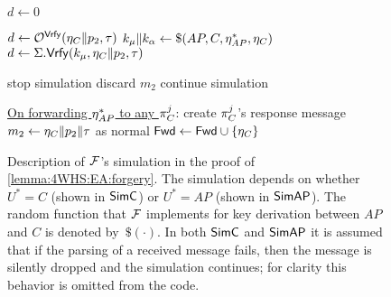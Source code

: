 \begin{figure}
\begin{adjustbox}{margin*=2ex,width=0.997\textwidth,frame,center}
\begin{minipage}[t]{0.5\textwidth}
\begin{algorithmic}[1]
					\EndIf
					
					\State
					\State $d \gets 0$ \label{code:simAP:line:d_bit_init}
										
					 \label{code:simAP:line:embed_MAC_oracle:check}
						\State $d \gets \mathcal{O}^{\macvrfy}(\nonce_{C} \concat p_2, \tau)$ \label{code:simAP:line:embed_MAC_oracle}
					\Else
						\State $\key_{\mu} \concat \key_\alpha \gets \$(AP, C, \nonce_{AP}^*, \nonce_{C})$ \label{code:simAP:line:derive_PTK}
						\State $d \gets \mac.\macvrfy(\key_{\mu}, \nonce_{C} \concat p_2, \tau)$ \label{code:simAP:line:local_MAC_check}
					\EndIf
					
					\State
					 \label{code:simAP:line:IFd=1}
						\State stop simulation \label{code:simAP:line:stop_simulation}
					\Else
						\State discard $m_2$
						\State continue simulation \label{code:simAP:line:m_2_end}
					\EndIf
					
				\EndIndent
				
				\Statex
				
				\Statex \underline{On forwarding $\nonce_{AP}^*$ to any $\oracle[C][j]$}: \label{code:simAP:line:forward_AP_nonce_start}
				\setcounter{ALG@line}{400} 
				\Indent
					\State create $\oracle[C][j]$'s response message 
					\State $m_2 \gets \nonce_C \concat p_2 \concat \tau$ as normal  
					\State $\mathsf{Fwd} \gets \mathsf{Fwd} \cup \lbrace \nonce_C \rbrace$ \label{code:simAP:line:forward_AP_nonce_end}
				\EndIndent	
		
	
			\end{algorithmic}
	\end{minipage}
	

\end{adjustbox}

\caption{Description of $\A[F]$'s simulation in the proof of \cref{lemma:4WHS:EA:forgery}.
The simulation depends on whether $U^* = C$ (shown in $\simC$) or $U^* = AP$ (shown in $\simAP$).
The random function that $\A[F]$ implements for key derivation between $AP$ and $C$ is denoted by~$\$(\cdot)$.
In both $\simC$ and $\simAP$ it is assumed that if the parsing of a received message fails,
then the message is silently dropped and the simulation continues;
for clarity this behavior is omitted from the code.}
\label{fig:proof:4WHS-EA:reduction_to_MAC}

\end{figure}